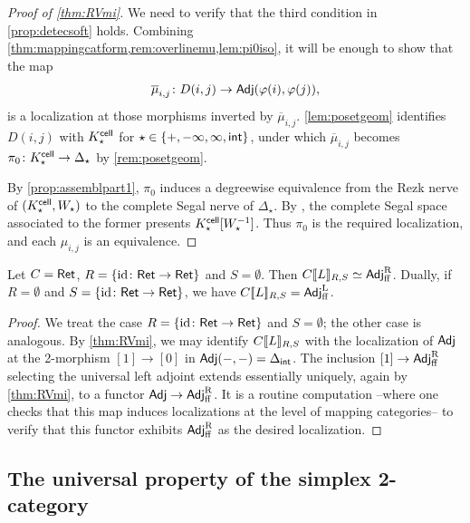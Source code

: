\documentclass[a4paper,reqno,twoside]{amsart}
\begin{document}
\begin{proof}[Proof of \cref{thm:RVmi}]

  We need to verify that the third condition in \cref{prop:detecsoft} holds. Combining \cref{thm:mappingcatform,rem:overlinemu,lem:pi0iso}, it will be enough to show that the map
  \[
 	\overline{\mu}_{i,j} \colon D(i,j) \to \mathsf{Adj}(\varphi(i),\varphi(j)),
   \]
   is a localization at those morphisms inverted by $\overline{\mu}_{i,j}$. \cref{lem:posetgeom} identifies $D(i,j)$ with $\relax{K}^{\mathsf{cell}}_\star$ for $\star \in \{+,-\infty,\infty,\mathsf{int}\}$, under which $\overline{\mu}_{i,j}$ becomes $\pi_0 \colon \relax{K}^{\mathsf{cell}}_\star \to \Delta_\star$ by \cref{rem:posetgeom}.

   By \cref{prop:assemblpart1}, $\pi_0$ induces a degreewise equivalence from the Rezk nerve of $(\relax{K}^{\mathsf{cell}}_\star,\relax{W}_\star)$ to the complete Segal nerve of $\Delta_\star$. By \cite[Theorem 3.8]{MazelGee2019UniversalityRezkNerve}, the complete Segal space associated to the former presents $\relax{K}^{\mathsf{cell}}_\star[\relax{W}_\star^{-1}]$. Thus $\pi_0$ is the required localization, and each $\mu_{i,j}$ is an equivalence.
\end{proof}

\begin{corollary}\label{cor:adfjffuniv}
	Let $\relax{C}=\mathsf{Ret}$, $R=\{\mathrm{id} \colon \mathsf{Ret} \to \mathsf{Ret}\}$ and $S=\emptyset$. Then $\relax{C}[\![\relax{L}]\!]_{R,S} \simeq \mathsf{Adj}^{\operatorname{R}}_{\mathrm{ff}}$. Dually, if $R=\emptyset$ and $S=\{\mathrm{id} \colon \mathsf{Ret} \to \mathsf{Ret}\}$, we have $\relax{C}[\![\relax{L}]\!]_{R,S}=\mathsf{Adj}^{\operatorname{L}}_{\mathrm{ff}}$.
\end{corollary}
\begin{proof}
	We treat the case $R=\{\mathrm{id} \colon \mathsf{Ret} \to \mathsf{Ret}\}$ and $S=\emptyset$; the other case is analogous. By \cref{thm:RVmi}, we may identify $\relax{C}[\![\relax{L}]\!]_{R,S}$ with the localization of $\mathsf{Adj}$ at the 2-morphism $[1] \to [0]$ in $\mathsf{Adj}(-,-)=\Delta_{\mathsf{int}}$. The inclusion $[1] \to \mathsf{Adj}^{\operatorname{R}}_{\mathrm{ff}}$ selecting the universal left adjoint extends essentially uniquely, again by \cref{thm:RVmi}, to a functor $\mathsf{Adj} \to \mathsf{Adj}^{\operatorname{R}}_{\mathrm{ff}}$. It is a routine computation --where one checks that this map induces localizations at the level of mapping categories-- to verify that this functor exhibits $\mathsf{Adj}^{\operatorname{R}}_{\mathrm{ff}}$ as the desired localization.
\end{proof}



\subsection{The universal property of the simplex 2-category}
\end{document}
